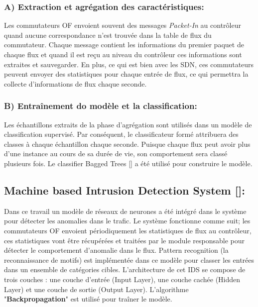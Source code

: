 \subsubsection{A) Extraction et agrégation des caractéristiques:}
Les commutateurs OF envoient souvent des messages \textit{Packet-In} au contrôleur quand aucune correspondance n’est trouvée dans la table de flux du commutateur. Chaque message contient les informations du premier paquet de chaque flux et quand il est reçu au niveau du contrôleur ces informations sont extraites et sauvegarder. En plus, ce qui est bien avec les SDN, ces commutateurs peuvent envoyer des statistiques pour chaque entrée de flux, ce qui permettra la collecte d'informations de flux chaque seconde. 

\subsubsection{B) Entraînement do modèle et la classification:}
Les échantillons extraits de la phase d’agrégation sont utilisés dans un modèle de classification supervisé. Par conséquent, le classificateur formé attribuera des classes à chaque échantillon chaque seconde. Puisque chaque flux peut avoir plus d’une instance au cours de sa durée de vie, son comportement sera classé plusieurs fois. Le classifier Bagged Trees [\cite{9}] a été utilisé pour construire le modèle.
\newpage
\subsection{Machine based Intrusion Detection System [\cite{10}]:}
Dans ce travail un modèle de réseaux de neurones a été intégré dans le système pour détecter les anomalies dans le trafic. Le système fonctionne comme suit; les commutateurs OF envoient périodiquement les statistiques de flux au contrôleur, ces statistiques vont être récupérées et traitées par le module responsable pour détecter le comportement d’anomalie dans le flux. Pattern recognition (la reconnaissance de motifs) est implémentée dans ce modèle pour classer les entrées dans un ensemble de catégories cibles. L’architecture de cet IDS se compose de trois couches : une couche d’entrée (Input Layer), une couche cachée (Hidden Layer) et une couche de sortie (Output Layer). L’algorithme "\textbf{Backpropagation}" est utilisé pour traîner le modèle.\\

